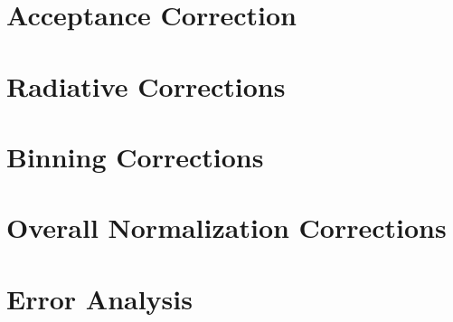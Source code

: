 \section{Acceptance Correction}

\section{Radiative Corrections}

\section{Binning Corrections}

\section{Overall Normalization Corrections}

\section{Error Analysis}

